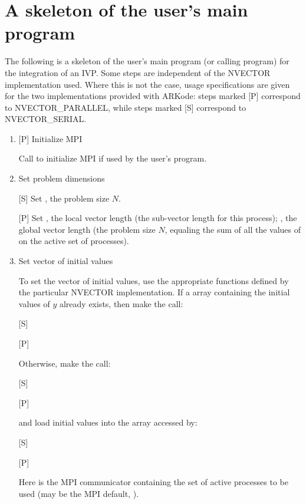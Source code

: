 \documentclass[letterpaper,10pt,english]{sphinxmanual}
\begin{document}
\section{A skeleton of the user's main program}
\label{c_interface/Skeleton::doc}\label{c_interface/Skeleton:a-skeleton-of-the-user-s-main-program}\label{c_interface/Skeleton:cinterface-skeleton}
The following is a skeleton of the user's main program (or calling
program) for the integration of an IVP.  Some steps are independent of
the NVECTOR implementation used.  Where this is not the case, usage
specifications are given for the two implementations provided with
ARKode: steps marked {[}P{]} correspond to NVECTOR\_PARALLEL, while steps
marked {[}S{]} correspond to NVECTOR\_SERIAL.
\begin{enumerate}
\item {} 
{[}P{]} Initialize MPI

Call  to initialize MPI if used by the user's program.

\item {} 
Set problem dimensions

{[}S{]} Set , the problem size $N$.

{[}P{]} Set , the local vector length (the sub-vector length
for this process); , the global vector length (the problem size
$N$, equaling the sum of all the values of  on the
active set of processes).

\item {} 
Set vector of initial values

To set the vector  of initial values, use the appropriate
functions defined by the particular NVECTOR implementation.  If a
 array  containing the initial values of $y$
already exists, then make the call:

{[}S{]} 

{[}P{]} 

Otherwise, make the call:

{[}S{]} 

{[}P{]} 

and load initial values into the array accessed by:

{[}S{]} 

{[}P{]} 

Here  is the MPI communicator containing the set of active
processes to be used (may be the MPI default, ).


\end{enumerate}
\end{document}
